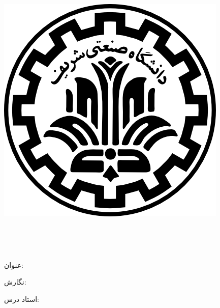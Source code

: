 
\pagestyle{empty}

\begin{center}

\includegraphics[scale=0.2]{front/template/images/logo.png}

\begin{large}

\vspace{-0.2cm}
\ThesisUniversity \\[-0.3em]
\ThesisDepartment

\vspace{0.5cm}

\ThesisType \\[-0.3em]
\ThesisMajor

\end{large}

\vspace{1cm}

{عنوان:}\\[1.2em]
{\LARGE\textbf{\ThesisTitle}}

\vspace{1cm}

{نگارش:}\\[.5em]
{\large\textbf{\ThesisAuthor}}

\vspace{0.7cm}

{استاد درس:}\\[.5em]
{\large\textbf{\ThesisSupervisor}}

\vspace{1.3cm}

\ThesisDate

\end{center}

\newpage
